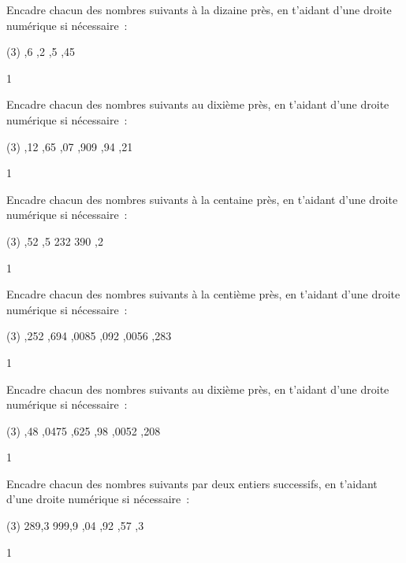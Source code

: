 \documentclass[a4paper,11pt]{report}
\begin{document}
\begin{exo}{
Encadre chacun des nombres suivants à la dizaine près, en t'aidant d'une droite numérique si nécessaire~:
\begin{tasks}[after-item-skip = 0.2em, after-skip=-0.5em](3)
,6
,2
,5
,45
\end{tasks}
}{1}\end{exo}
\begin{exo}{
Encadre chacun des nombres suivants au dixième près, en t'aidant d'une droite numérique si nécessaire~:
\begin{tasks}[after-item-skip = 0.2em, after-skip=-0.5em](3)
,12
,65
,07
,909
,94
,21
\end{tasks}
}{1}\end{exo}
\begin{exo}{
Encadre chacun des nombres suivants à la centaine près, en t'aidant d'une droite numérique si nécessaire~:
\begin{tasks}(3)
,52
,5
 232 390
,2
\end{tasks}
}{1}\end{exo}
\begin{exo}{
Encadre chacun des nombres suivants à la centième près, en t'aidant d'une droite numérique si nécessaire~:
\begin{tasks}(3)
,252
,694
,0085
,092
,0056
,283
\end{tasks}
}{1}\end{exo}
\begin{exo}{
Encadre chacun des nombres suivants au dixième près, en t'aidant d'une droite numérique si nécessaire~:
\begin{tasks}(3)
,48
,0475
,625
,98
,0052
,208
\end{tasks}
}{1}\end{exo}
\begin{exo}{
Encadre chacun des nombres suivants par deux entiers successifs, en t'aidant d'une droite numérique si nécessaire~:
\begin{tasks}(3)
 289,3
 999,9
,04
,92
,57
,3
\end{tasks}
}{1}\end{exo}
\end{document}
